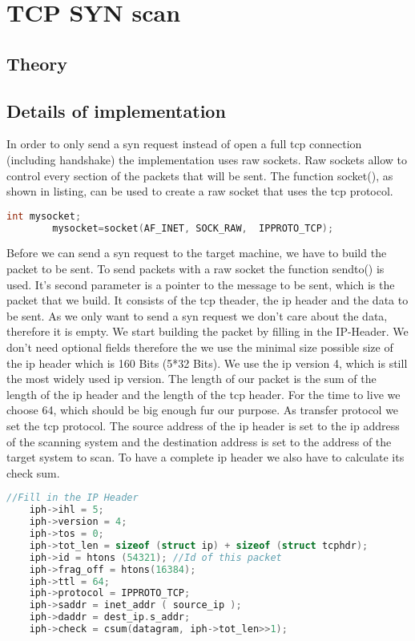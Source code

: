 	\section{TCP SYN scan}
	\label{sec:syn}
	\subsection{Theory}
	
	
	
	\subsection{Details of implementation}
	In order to only send a syn request instead of open a full tcp connection (including handshake) the implementation uses raw sockets. Raw sockets allow to control
	every section of the packets that will be sent. The function socket(), as shown in listing, can be used to create a raw socket that uses the tcp protocol.
	\begin{lstlisting}[frame= single, language=C, caption= C code to use the connect() to check if port is open]
		int mysocket;
		mysocket=socket(AF_INET, SOCK_RAW,  IPPROTO_TCP);
	\end{lstlisting}
	Before we can send a syn request to the target machine, we have to build the packet to be sent. To send packets with a raw socket the function sendto() is used.
	It's second parameter is a pointer to the message to be sent, which 
	is the packet that we build. It consists of the tcp theader, the ip header and the data
	to be sent. As we only want to send a syn request we don't care about the data, therefore it is empty. We start building the packet by filling in the IP-Header. We don't need optional fields therefore the we use the minimal size possible size of the ip header which is 160 Bits (5*32 Bits). We use the ip version 4, which is still the most widely used ip version. The length of our packet
	is the sum of the length of the ip header and the length of the tcp header. For the time to live we choose 64, which should be big enough
	fur our purpose. As transfer protocol we set the tcp protocol. The source address of the ip header is set to the ip address of the scanning system and the destination address is set to the address of the target system to scan. To have a complete ip header we also
	have to calculate its check sum.
	\begin{lstlisting}[frame= single, language=C, caption= C code to fill in ip header]
	//Fill in the IP Header
	iph->ihl = 5;
	iph->version = 4;
	iph->tos = 0;
	iph->tot_len = sizeof (struct ip) + sizeof (struct tcphdr);
	iph->id = htons (54321); //Id of this packet
	iph->frag_off = htons(16384);
	iph->ttl = 64;
	iph->protocol = IPPROTO_TCP;
	iph->saddr = inet_addr ( source_ip );   
	iph->daddr = dest_ip.s_addr;
	iph->check = csum(datagram, iph->tot_len>>1);
	\end{lstlisting}
